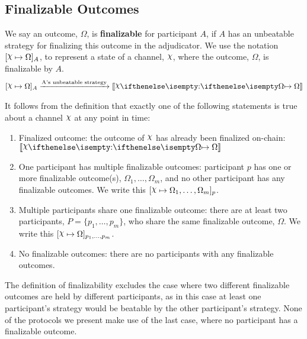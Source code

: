 \subsection{Finalizable Outcomes}\label{sec:finalizable-outcomes}

We say an outcome, $\Omega$, is \textbf{finalizable} for participant $A$, if $A$ has an unbeatable
strategy for finalizing this outcome in the adjudicator.
We use the notation $\finalizable{\rchi}{\Omega}{A}$, to represent a state of a channel, $\rchi$,
where the outcome, $\Omega$, is finalizable by $A$.
\begin{align}
  \finalizable{\rchi}{\Omega}{A} \xrightarrow{\text{A's unbeatable strategy}} \adj{\holds{\rchi}{}{\Omega}}
\end{align}

It follows from the definition that exactly one of the following statements is true about
a channel $\rchi$ at any point in time:
\begin{enumerate}
  \item Finalized outcome: the outcome of $\rchi$ has already been finalized on-chain: $\adj{\holds{\rchi}{}{\Omega}}$
  \item One participant has multiple finalizable outcomes: participant $p$ has one or more finalizable outcome(s), $\Omega_1, \dots, \Omega_m$, and no other participant has any finalizable outcomes.
        We write this $\finalizable{\rchi}{\Omega_1, \dots, \Omega_m}{p}$.
  \item Multiple participants share one finalizable outcome: there are at least two participants, $P = \{p_1, \dots, p_m \}$, who share the same
        finalizable outcome, $\Omega$. We write this $\finalizable{\rchi}{\Omega}{p_1, \dots, p_m}$.
  \item No finalizable outcomes: there are no participants with any finalizable outcomes.
\end{enumerate}
The definition of finalizability excludes the case where two different finalizable outcomes are held
by different participants, as in this case at least one participant's strategy would be beatable
by the other participant's strategy.
None of the protocols we present make use of the last case, where no participant has a finalizable outcome.

